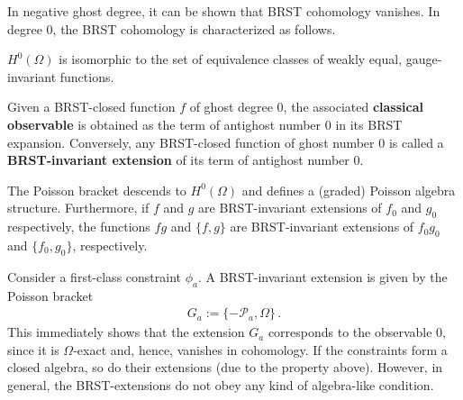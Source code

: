     In negative ghost degree, it can be shown that BRST cohomology vanishes. In degree 0, the BRST cohomology is characterized as follows.
    \begin{property}\label{constraint:brst_0}
        $H^0(\Omega)$ is isomorphic to the set of equivalence classes of weakly equal, gauge-invariant functions.

        Given a BRST-closed function $f$ of ghost degree 0, the associated \textbf{classical observable} is obtained as the term of antighost number 0 in its BRST expansion. Conversely, any BRST-closed function of ghost number 0 is called a \textbf{BRST-invariant extension} of its term of antighost number 0.
    \end{property}
    \begin{property}
        The Poisson bracket descends to $H^0(\Omega)$ and defines a (graded) Poisson algebra structure. Furthermore, if $f$ and $g$ are BRST-invariant extensions of $f_0$ and $g_0$ respectively, the functions $fg$ and $\{f,g\}$ are BRST-invariant extensions of $f_0g_0$ and $\{f_0,g_0\}$, respectively.
    \end{property}

    \begin{example}
        Consider a first-class constraint $\phi_a$. A BRST-invariant extension is given by the Poisson bracket
        \begin{gather}
            G_a := \{-\mathcal{P}_a,\Omega\}\,.
        \end{gather}
        This immediately shows that the extension $G_a$ corresponds to the observable 0, since it is $\Omega$-exact and, hence, vanishes in cohomology. If the constraints form a closed algebra, so do their extensions (due to the property above). However, in general, the BRST-extensions do not obey any kind of algebra-like condition.
    \end{example}



